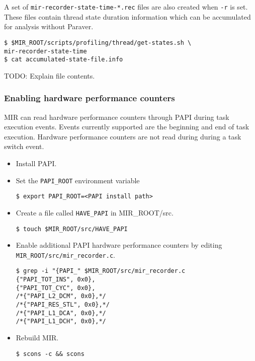\documentclass[11pt,a4paper]{article}
\begin{document}
A set of \texttt{mir-recorder-state-time-*.rec} files are also created when \texttt{-r} is set. These files contain thread state duration information which can be accumulated for analysis without Paraver.

\begin{lstlisting}[style=MyInputStyle]
$ $MIR_ROOT/scripts/profiling/thread/get-states.sh \
mir-recorder-state-time
$ cat accumulated-state-file.info
\end{lstlisting}

TODO: Explain file contents.

\subsubsection{Enabling hardware performance counters}\label{enabling-hardware-performance-counters}

MIR can read hardware performance counters through PAPI during task execution events. Events currently supported are the beginning and end of task execution.
Hardware performance counters are not read during during a task switch event.

\begin{itemize}
\item Install PAPI.
\item Set the \texttt{PAPI\_ROOT} environment variable

\begin{lstlisting}[style=MyInputStyle]
$ export PAPI_ROOT=<PAPI install path>
\end{lstlisting}

\item Create a file called \texttt{HAVE\_PAPI} in MIR\_ROOT/src.

\begin{lstlisting}[style=MyInputStyle]
$ touch $MIR_ROOT/src/HAVE_PAPI
\end{lstlisting}

\item Enable additional PAPI hardware performance counters by editing \texttt{MIR\_ROOT/src/mir\_recorder.c}.

\begin{lstlisting}[style=MyInputStyle]
$ grep -i "{PAPI_" $MIR_ROOT/src/mir_recorder.c
{"PAPI_TOT_INS", 0x0},
{"PAPI_TOT_CYC", 0x0},
/*{"PAPI_L2_DCM", 0x0},*/
/*{"PAPI_RES_STL", 0x0},*/
/*{"PAPI_L1_DCA", 0x0},*/
/*{"PAPI_L1_DCH", 0x0},*/
\end{lstlisting}

\item Rebuild MIR.

\begin{lstlisting}[style=MyInputStyle]
$ scons -c && scons
\end{lstlisting}
\end{itemize}
\end{document}
